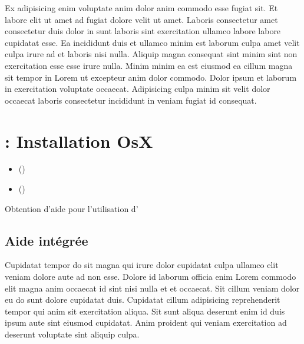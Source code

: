 \documentclass[a4paper,10pt,french]{sphinxmanual}
\begin{document}
Ex adipisicing enim voluptate anim dolor anim commodo esse fugiat sit. Et labore elit ut amet ad fugiat dolore velit ut amet. Laboris consectetur amet consectetur duis dolor in sunt laboris sint exercitation ullamco labore labore cupidatat esse. Ea incididunt duis et ullamco minim est laborum culpa amet velit culpa irure ad et laboris nisi nulla. Aliquip magna consequat sint minim sint non exercitation esse esse irure nulla. Minim minim ea est eiusmod ea cillum magna sit tempor in Lorem ut excepteur anim dolor commodo. Dolor ipsum et laborum in exercitation voluptate occaecat. Adipisicing culpa minim sit velit dolor occaecat laboris consectetur incididunt in veniam fugiat id consequat.


\section{ : Installation OsX}
\label{\detokenize{docs/refs/start/install/installation-osx::doc}}\label{\detokenize{docs/refs/start/install/installation-osx:autodesk}}\label{\detokenize{docs/refs/start/install/installation-osx:acad-installation-osx}}

\begin{sphinxShadowBox}
\begin{itemize}
\item {} 
\label{\detokenize{docs/refs/start/install/installation-osx:id1}}{\hyperref[\detokenize{docs/refs/start/install/installation-osx:aide-integree}]{}} ()

\item {} 
\label{\detokenize{docs/refs/start/install/installation-osx:id2}}{\hyperref[\detokenize{docs/refs/start/install/installation-osx:aide-en-ligne-internet}]{}} ()

\end{itemize}
\end{sphinxShadowBox}

Obtention d'aide pour l'utilisation d'


\subsection{Aide intégrée}
\label{\detokenize{docs/refs/start/install/installation-osx:aide-integree}}
Cupidatat tempor do sit magna qui irure dolor cupidatat culpa ullamco elit veniam dolore aute ad non esse. Dolore id laborum officia enim Lorem commodo elit magna anim occaecat id sint nisi nulla et et occaecat. Sit cillum veniam dolor eu do sunt dolore cupidatat duis. Cupidatat cillum adipisicing reprehenderit tempor qui anim sit exercitation aliqua. Sit sunt aliqua deserunt enim id duis ipsum aute sint eiusmod cupidatat. Anim proident qui veniam exercitation ad deserunt voluptate sint aliquip culpa.
\end{document}
